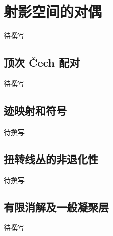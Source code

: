 
% 
% 

\section{射影空间的对偶}
\label{g5:sec:2201}

待撰写

\subsection{顶次 Čech 配对}
\label{g5:subsec:2201:01}
待撰写

\subsection{迹映射和符号}
\label{g5:subsec:2201:02}
待撰写

\subsection{扭转线丛的非退化性}
\label{g5:subsec:2201:03}
待撰写

\subsection{有限消解及一般凝聚层}
\label{g5:subsec:2201:04}
待撰写
